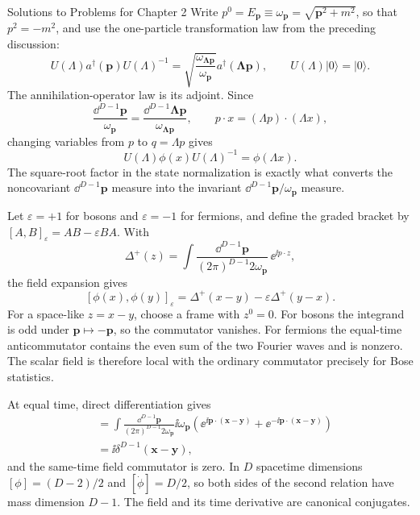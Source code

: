 \begin{bankssolutions}{Solutions to Problems for Chapter 2}
Write $p^{0}=E_{\mathbf p}\equiv\omega_{\mathbf p}=\sqrt{\mathbf p^{2}+m^{2}}$, so that $p^{2}=-m^{2}$, and use the one-particle transformation law from the preceding discussion:
\[
  U(\Lambda)a^{\dagger}(\mathbf p)U(\Lambda)^{-1}
  =\sqrt{\frac{\omega_{\boldsymbol{\Lambda p}}}{\omega_{\mathbf p}}}
    a^{\dagger}(\boldsymbol{\Lambda p}),
  \qquad U(\Lambda)|0\rangle=|0\rangle.
\]
The annihilation-operator law is its adjoint. Since
\[
  \frac{\dd^{D-1}\mathbf p}{\omega_{\mathbf p}}=\frac{\dd^{D-1}\boldsymbol{\Lambda p}}{\omega_{\boldsymbol{\Lambda p}}},
  \qquad p\mathbin{\cdot}x=(\Lambda p)\mathbin{\cdot}(\Lambda x),
\]
changing variables from $p$ to $q=\Lambda p$ gives
\[
  U(\Lambda)\phi(x)U(\Lambda)^{-1}=\phi(\Lambda x).
\]
The square-root factor in the state normalization is exactly what converts the noncovariant $\dd^{D-1}\mathbf p$ measure into the invariant $\dd^{D-1}\mathbf p/\omega_{\mathbf p}$ measure.

Let $\varepsilon=+1$ for bosons and $\varepsilon=-1$ for fermions, and define the graded bracket by $[A,B]_{\varepsilon}=AB-\varepsilon BA$. With
\[
  \Delta^{+}(z)=\int\frac{\dd^{D-1}\mathbf p}{(2\pi)^{D-1}2\omega_{\mathbf p}}\,\ee^{\ii p\mathbin{\cdot}z},
\]
the field expansion gives
\[
  [\phi(x),\phi(y)]_{\varepsilon}
  =\Delta^{+}(x-y)-\varepsilon\Delta^{+}(y-x).
\]
For a space-like $z=x-y$, choose a frame with $z^{0}=0$. For bosons the integrand is odd under $\mathbf p\mapsto-\mathbf p$, so the commutator vanishes. For fermions the equal-time anticommutator contains the even sum of the two Fourier waves and is nonzero. The scalar field is therefore local with the ordinary commutator precisely for Bose statistics.

At equal time, direct differentiation gives
\begin{align*}
  [\phi(t,\mathbf x),\dot\phi(t,\mathbf y)]
  &=\int\frac{\dd^{D-1}\mathbf p}{(2\pi)^{D-1}2\omega_{\mathbf p}}
    \ii\omega_{\mathbf p}\left(\ee^{\ii\mathbf p\cdot(\mathbf x-\mathbf y)}
    +\ee^{-\ii\mathbf p\cdot(\mathbf x-\mathbf y)}\right)\\
  &=\ii\delta^{D-1}(\mathbf x-\mathbf y),
\end{align*}
and the same-time field commutator is zero. In $D$ spacetime dimensions $[\phi]=(D-2)/2$ and $[\dot\phi]=D/2$, so both sides of the second relation have mass dimension $D-1$. The field and its time derivative are canonical conjugates.


\end{bankssolutions}
